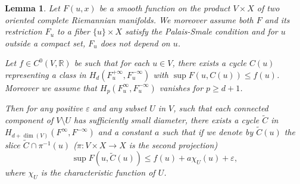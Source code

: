 \documentclass[JEP,XML,SOM,NoFloatCountersInSection,Unicode,published]{cedram}
\numberwithin{equation}{section}
\theoremstyle{plain}
\newtheorem{lemma}[theorem]{Lemma}
\theoremstyle{definition}
\theoremstyle{remark}
\begin{document}
\begin{lemma}
Let $F(u,x)$ be a smooth function on the product $V\times X$ of two oriented complete Riemannian manifolds. We moreover assume both $F$ and its restriction $F_{u}$ to a fiber $\{u\}\times X$ satisfy the Palais-Smale condition and for $u$ outside a compact set, $F_{u}$ does not depend on $u$.

Let $f\in C^0(V, {\mathbb R})$ be such that for each $u \in V$, there exists a cycle $C(u)$ representing a class in $ H_{d}(F_{u}^{+\infty},F_{u}^{-\infty})$
with $\sup F(u, C(u))\leq f(u)$.
Moreover we assume that $H_{p}(F_{u}^{\infty}, F_{u}^{-\infty})$ vanishes for $p\geq d+1$.

Then for any positive $ \varepsilon $ and any subset $U$ in $V$, such that each connected component of $V\setminus U$ has sufficiently small diameter, there exists a cycle $\widetilde C$ in $H_{d+\dim(V)}(F^{\infty}, F^{-\infty})$ and a constant $a$ such that if we denote by $\widetilde C(u)$ the slice $\widetilde C \cap \pi^{-1}(u)$ ($\pi:V\times X \to X$ is the second projection)\vspace*{-3pt}
\[
\sup F(u,\widetilde C(u)) \leq f(u)+a \chi_{U}(u)+ \varepsilon,
\]
where $\chi_U$ is the characteristic function of $U$.
\end{lemma}
\end{document}

